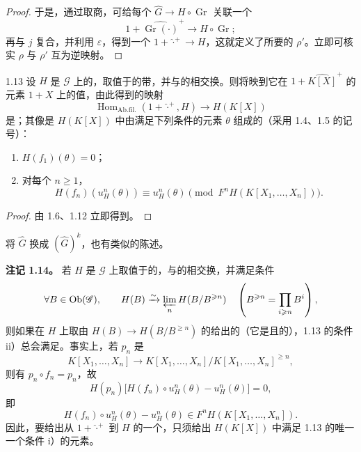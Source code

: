 \begin{proof}
于是，通过取商，可给每个 $\widehat G\longrightarrow H\circ\operatorname{Gr}$ 关联一个
\[
1+\widehat{\operatorname{Gr}(\cdot)}^{+}\longrightarrow H\circ\operatorname{Gr};
\]
再与 $j$ 复合，并利用 $\varepsilon$，得到一个 $1+\widehat{\cdot}^{+}\longrightarrow H$，这就定义了所要的 $\rho'$。立即可核实 $\rho$ 与 $\rho'$ 互为逆映射。
\end{proof}

\begin{SGAresult}{}{1.13}
设 $H$ 是 $\mathscr G$ 上的，取值于的带，并与的相交换。则将映到它在
$1+\widehat{K[X]}^{+}$ 的元素 $1+X$ 上的值，由此得到的映射
\[
\operatorname{Hom}_{\mathrm{Ab.fil.}}(1+\widehat{\cdot}^{+},H)\longrightarrow H(K[X])
\]
是；其像是 $H(K[X])$ 中由满足下列条件的元素 $\theta$ 组成的（采用 1.4、1.5 的记号）：
\begin{enumerate}
\item[i)] $H(f_1)(\theta)=0$；
\item[ii)] 对每个 $n\geqslant1$，
\[
H(f_n)(u_H^n(\theta))\equiv u_H^n(\theta)
\pmod{F^nH(K[X_1,\ldots,X_n])}.
\]
\end{enumerate}
\end{SGAresult}
\begin{proof}
由 1.6、1.12 立即得到。
\end{proof}
将 $\widehat G$ 换成 $(\widehat G)^k$，也有类似的陈述。

\textbf{注记 1.14。} 若 $H$ 是 $\mathscr G$ 上取值于的，与的相交换，并满足条件
\[
\forall B\in\operatorname{Ob}(\mathscr G),\qquad
H(B)\xrightarrow{\sim}\varprojlim_nH(B/B^{\geqslant n})
\quad\left(B^{\geqslant n}=\prod_{i\geqslant n}B^i\right),
\]
则如果在 $H$ 上取由 $H(B)\longrightarrow H(B/B^{\geqslant n})$ 的给出的（它是且的），1.13 的条件 ii）总会满足。事实上，若 $p_n$ 是
\[
K[X_1,\ldots,X_n]\longrightarrow
K[X_1,\ldots,X_n]/K[X_1,\ldots,X_n]^{\geqslant n},
\]
则有 $p_n\circ f_n=p_n$，故
\[
H(p_n)\bigl[H(f_n)\circ u_H^n(\theta)-u_H^n(\theta)\bigr]=0,
\]
即
\[
H(f_n)\circ u_H^n(\theta)-u_H^n(\theta)
\in F^nH(K[X_1,\ldots,X_n]).
\]
因此，要给出从 $1+\widehat{\cdot}^{+}$ 到 $H$ 的一个，只须给出 $H(K[X])$ 中满足 1.13 的唯一一个条件 i）的元素。

